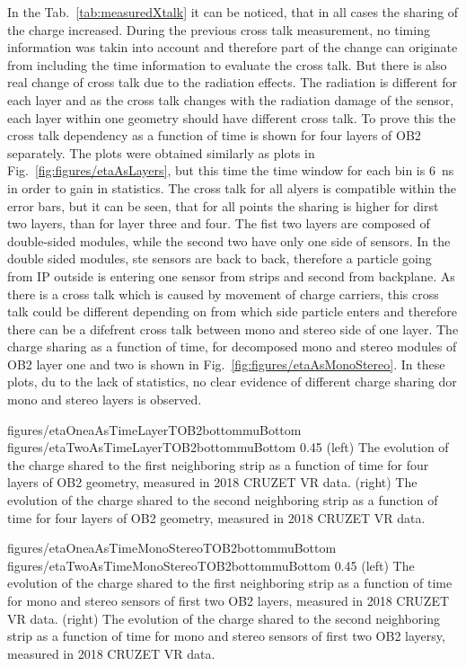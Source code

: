 In the Tab.~\ref{tab:measuredXtalk} it can be noticed, that in all cases the sharing of the charge increased. During the previous cross talk measurement, no timing information was takin into account and therefore part of the change can originate from including the time information to evaluate the cross talk. But there is also real change of cross talk due to the radiation effects. The radiation is different for each layer and as the cross talk changes with the radiation damage of the sensor, each layer within one geometry should have different cross talk. To prove this the cross talk dependency as a function of time is shown for four layers of OB2 separately. The plots were obtained similarly as plots in Fig.~\ref{fig:figures/etaAsLayers}, but this time the time window for each bin is 6~ns in order to gain in statistics. The cross talk for all alyers is compatible within the error bars, but it can be seen, that for all points the sharing is higher for dirst two layers, than for layer three and four. The fist two layers are composed of double-sided modules, while the second two have only one side of sensors. In the double sided modules, ste sensors are back to back, therefore a particle going from IP outside is entering one sensor from strips and second from backplane. As there is a cross talk which is caused by movement of charge carriers, this cross talk could be different depending on from which side particle enters and therefore there can be a difefrent cross talk between mono and stereo side of one layer. The charge sharing as a function of time, for decomposed mono and stereo modules of OB2 layer one and two is shown in Fig.~\ref{fig:figures/etaAsMonoStereo}. In these plots, du to the lack of statistics,  no clear evidence of different charge sharing dor mono and stereo layers is observed.


                 {figures/etaOneaAsTimeLayerTOB2bottommuBottom}
                 {figures/etaTwoAsTimeLayerTOB2bottommuBottom} %
                 {0.45}       %
                 {(left) The evolution of the charge shared to the first neighboring strip as a function of time for four layers of OB2 geometry, measured in 2018 CRUZET VR data.  (right) The evolution of the charge shared to the second neighboring strip as a function of time for four layers of OB2 geometry, measured in 2018 CRUZET VR data. }


                 {figures/etaOneaAsTimeMonoStereoTOB2bottommuBottom}
                 {figures/etaTwoAsTimeMonoStereoTOB2bottommuBottom} %
                 {0.45}       %
                 {(left) The evolution of the charge shared to the first neighboring strip as a function of time for mono and stereo sensors of first two OB2 layers, measured in 2018 CRUZET VR data.  (right) The evolution of the charge shared to the second neighboring strip as a function of time for mono and stereo sensors of first two OB2 layersy, measured in 2018 CRUZET VR data. }



